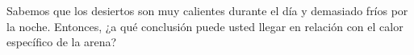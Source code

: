 Sabemos que los desiertos son muy calientes durante el día y demasiado fríos por la noche. Entonces, ¿a qué conclusión puede usted llegar en relación con el calor específico de la arena?